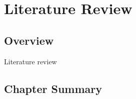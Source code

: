 \chapter{Literature Review}\label{ch02}

\section{Overview}
Literature review


\section{Chapter Summary}
